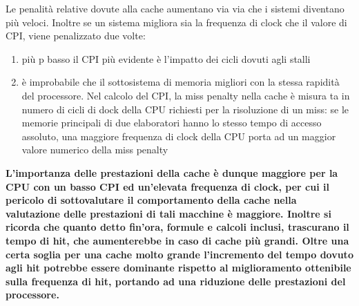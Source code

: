 \documentclass[a4paper,12pt, oneside]{book}
\begin{document}
Le penalità relative dovute alla cache aumentano via via che i
sistemi diventano più veloci. Inoltre se un sistema migliora sia la
frequenza di clock che il valore di CPI, viene penalizzato due volte:
\begin{enumerate}
  \item più p basso il CPI più evidente è l'impatto dei cicli dovuti
  agli stalli
  \item è improbabile che il sottosistema di memoria migliori con la
  stessa rapidità del processore. Nel calcolo del CPI, la miss penalty
  nella cache è misura ta in numero di cicli di dock della CPU richiesti
  per la risoluzione di un miss: se le memorie principali di due
  elaboratori hanno lo stesso tempo di accesso assoluto, una maggiore
  frequenza di clock della CPU porta ad un maggior valore
  numerico della miss penalty
\end{enumerate}
\textbf{L'importanza delle prestazioni della cache è dunque maggiore
  per la CPU con un basso CPI ed un'elevata frequenza di clock, per
  cui il pericolo di sottovalutare il comportamento della cache nella
  valutazione delle prestazioni di tali macchine è maggiore. Inoltre
  si ricorda che quanto detto fin'ora, formule e calcoli inclusi,
  trascurano il tempo di hit, che aumenterebbe in caso di cache più
  grandi. Oltre una certa soglia per una cache molto grande
  l'incremento del tempo dovuto agli hit potrebbe essere dominante rispetto al
  miglioramento ottenibile sulla frequenza di hit, portando ad una riduzione delle
  prestazioni del processore.}\\
\end{document}
